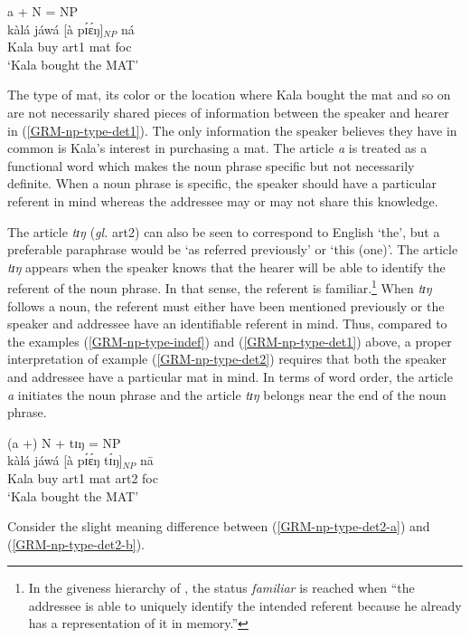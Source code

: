 \begin{exe}
\begin{exe}
\begin{exe}
{\begin{exe}
\begin{exe}
\begin{exe}
 \ex\label{GRM-np-type-det1}{\rm  a + N = NP}\\
\gll  kàlá jáwá  [à pɪ́ɛ́ŋ]$_{NP}$ ná\\
     Kala buy {\sc art1}  mat {\sc foc}\\
\glt  `Kala bought the MAT' 
\z


The type of mat,  its color or the location where Kala bought the mat and so on
are not necessarily shared pieces of information between the speaker and hearer
in (\ref{GRM-np-type-det1}).  The only information the speaker believes they
have in common is Kala's interest in purchasing a mat. The article {\it a} is 
treated as a functional word which makes the noun phrase specific but not
necessarily
definite.  When a noun phrase is  specific, the speaker should have a particular
referent in mind whereas the addressee may or may not share this knowledge.


The article {\it tɪŋ}  ({\it gl.} {\sc art2}) can also be seen to correspond to
English `the',  but a preferable paraphrase would be `as referred previously' or
 `this (one)'.  The article {\it  tɪŋ} appears when the speaker knows that the
hearer will be able to identify the referent of the noun phrase. In that sense,
the referent is familiar.\footnote{In the giveness hierarchy of
\citet[278]{Gund93}, the status {\it familiar} is reached when ``the addressee
is able to uniquely identify the intended referent because he already has a
representation of it in memory.''}   When {\it tɪŋ} follows a noun, the referent
must either have been mentioned previously or the speaker and addressee have an
identifiable referent in mind. Thus, compared to the examples
(\ref{GRM-np-type-indef}) and (\ref{GRM-np-type-det1}) above, a proper
interpretation of example (\ref{GRM-np-type-det2}) requires that both the
speaker and addressee have a particular mat in mind. In terms of word order, the
article  {\it a}  initiates the noun phrase and  the article {\it tɪŋ}  belongs
near the end of the noun phrase. 
 

\begin{exe}
 \ex\label{GRM-np-type-det2}{\rm   (a +) N + tɪŋ = NP}\\
\gll  kàlá jáwá  [à pɪ́ɛ́ŋ  tɪ́ŋ]$_{NP}$ nā\\
     Kala buy {\sc art1}  mat {\sc art2} {\sc foc}\\
\glt  `Kala bought the MAT'
\z

Consider the slight meaning difference between
(\ref{GRM-np-type-det2-a}) and (\ref{GRM-np-type-det2-b}).



\end{exe}
\end{exe}
\end{exe}
\end{exe}}
\end{exe}
\end{exe}
\end{exe}
